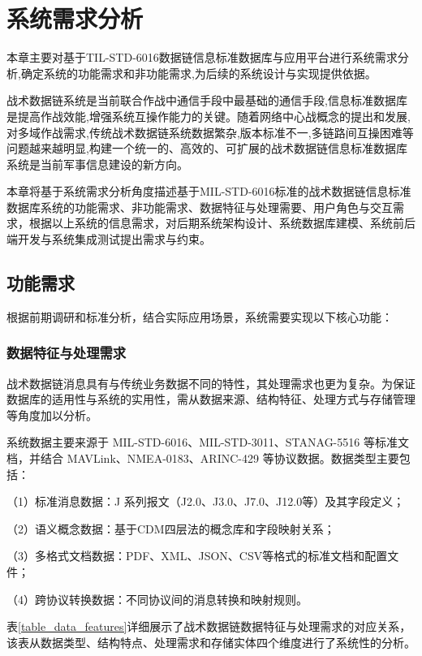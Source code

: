 \chapter{系统需求分析}

本章主要对基于TIL-STD-6016数据链信息标准数据库与应用平台进行系统需求分析,确定系统的功能需求和非功能需求,为后续的系统设计与实现提供依据。

战术数据链系统是当前联合作战中通信手段中最基础的通信手段,信息标准数据库是提高作战效能,增强系统互操作能力的关键。随着网络中心战概念的提出和发展,对多域作战需求,传统战术数据链系统数据繁杂,版本标准不一,多链路间互操困难等问题越来越明显,构建一个统一的、高效的、可扩展的战术数据链信息标准数据库系统是当前军事信息建设的新方向。

本章将基于系统需求分析角度描述基于MIL-STD-6016标准的战术数据链信息标准数据库系统的功能需求、非功能需求、数据特征与处理需要、用户角色与交互需求，根据以上系统的信息需求，对后期系统架构设计、系统数据库建模、系统前后端开发与系统集成测试提出需求与约束。

\section{功能需求}

根据前期调研和标准分析，结合实际应用场景，系统需要实现以下核心功能：

\subsection{数据特征与处理需求}
战术数据链消息具有与传统业务数据不同的特性，其处理需求也更为复杂。为保证数据库的适用性与系统的实用性，需从数据来源、结构特征、处理方式与存储管理等角度加以分析\cite{baek2016_jsac}。

系统数据主要来源于 {MIL-STD-6016}、{MIL-STD-3011}、{STANAG-5516} 等标准文档，并结合 {MAVLink}、{NMEA-0183}、{ARINC-429} 等协议数据。数据类型主要包括：

（1）标准消息数据：J 系列报文（J2.0、J3.0、J7.0、J12.0等）及其字段定义；

（2）语义概念数据：基于CDM四层法的概念库和字段映射关系；

（3）多格式文档数据：PDF、XML、JSON、CSV等格式的标准文档和配置文件；

（4）跨协议转换数据：不同协议间的消息转换和映射规则。

表\ref{table_data_features}详细展示了战术数据链数据特征与处理需求的对应关系，该表从数据类型、结构特点、处理需求和存储实体四个维度进行了系统性的分析。

